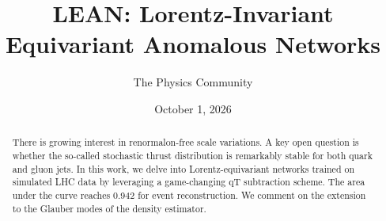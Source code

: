 \documentclass[11pt]{article}
\title{LEAN: Lorentz-Invariant Equivariant Anomalous Networks}
\author{The Physics Community}
\date{October 1, 2026}
\begin{document}
\maketitle
\begin{abstract}
There is growing interest in renormalon-free scale variations. A key
open question is whether the so-called stochastic thrust distribution is
remarkably stable for both quark and gluon jets. In this work, we delve
into Lorentz-equivariant networks trained on simulated LHC data by
leveraging a game-changing qT subtraction scheme. The area under the
curve reaches 0.942 for event reconstruction. We comment on the
extension to the Glauber modes of the density estimator.
\end{abstract}
\tableofcontents




\nocite{*}


\end{document}

